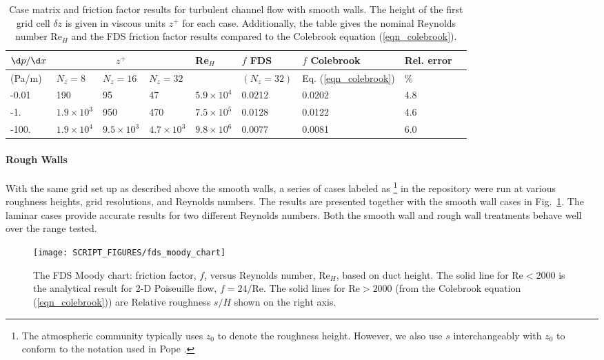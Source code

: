 \documentclass[11pt]{book}
\begin{document}
\begin{table}
\centering
\caption[Case matrix for Moody chart]{Case matrix and friction factor results for turbulent channel flow with smooth walls. The height of the first grid cell $\delta z$ is given in viscous units $z^+$ for each case.  Additionally, the table gives the nominal Reynolds number Re$_H$ and the FDS friction factor results compared to the Colebrook equation (\ref{eqn_colebrook}).}
\begin{tabular}{|*{9}{l|}}
\hline
$\d p/\d x$   & \multicolumn{3}{c|}{$z^+$} &  Re$_H$  & $f$ FDS  & $f$ Colebrook & Rel. error \\
\hline (Pa/m)           & $N_z=8$          & $N_z=16$          & $N_z=32$          &                   & $(N_z=32)$ & Eq. (\ref{eqn_colebrook}) & \% \\
\hline\hline -0.01      & 190              & 95                & 47                & $5.9\times 10^4$  & 0.0212     & 0.0202   & 4.8                 \\
\hline -1.    & $1.9\times 10^3$ & 950               & 470               & $7.5\times 10^5$  & 0.0128     & 0.0122   & 4.6                 \\
\hline -100.  & $1.9\times 10^4$ & $9.5\times 10^3$  & $4.7\times 10^3$  & $9.8\times 10^6$  & 0.0077     & 0.0081   & 6.0                 \\
\hline
\end{tabular}
\label{tab_zplus}
\end{table}

\paragraph{Rough Walls}

With the same grid set up as described above the smooth walls, a series of cases labeled as \footnote{The atmospheric community typically uses $z_0$ to denote the roughness height. However, we also use $s$ interchangeably with $z_0$ to conform to the notation used in Pope \cite{Pope:2000}.} in the repository \cite{FDS-SMV_repository} were run at various roughness heights, grid resolutions, and Reynolds numbers. The results are presented together with the smooth wall cases in Fig.~\ref{fig_fds_moody_chart}. The laminar cases provide accurate results for two different Reynolds numbers. Both the smooth wall and rough wall treatments behave well over the range tested.

\begin{figure}[ht]
\centering
\texttt{[image: SCRIPT\_FIGURES/fds\_moody\_chart]}
\caption[FDS Moody chart]{The FDS Moody chart: friction factor, $f$, versus Reynolds number, Re$_H$, based on duct height. The solid line for $\mbox{Re} < 2000$ is the analytical result for 2-D Poiseuille flow, $f=24/\mbox{Re}$. The solid lines for $\mbox{Re}>2000$ (from the Colebrook equation (\ref{eqn_colebrook})) are Relative roughness $s/H$ shown on the right axis.}
\label{fig_fds_moody_chart}
\end{figure}
\end{document}
